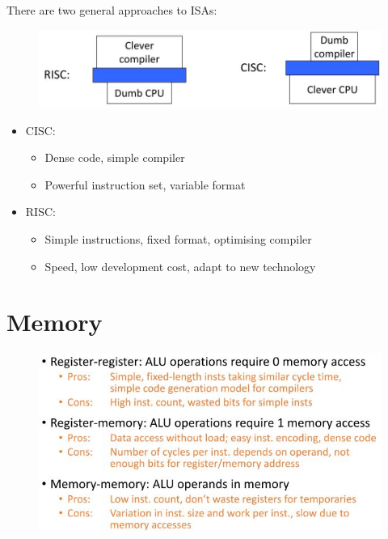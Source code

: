 \documentclass[10pt,a4paper]{article}
\begin{document}
There are two general approaches to ISAs:
\begin{figure} [h!]
    \centering
    \includegraphics[scale=0.5]{ISA.JPG}
\end{figure}
\begin{itemize}
    \item CISC: 
    \begin{itemize}
        \item Dense code, simple compiler
        \item Powerful instruction set, variable format
    \end{itemize}
    \item RISC:
    \begin{itemize}
        \item Simple instructions, fixed format, optimising compiler
        \item Speed, low development cost, adapt to new technology
    \end{itemize}
\end{itemize}

\pagebreak

\section{Memory}

\begin{figure} [h!]
    \centering
    \includegraphics[scale=0.8]{Memo.JPG}
\end{figure}



\pagebreak

\end{document}
